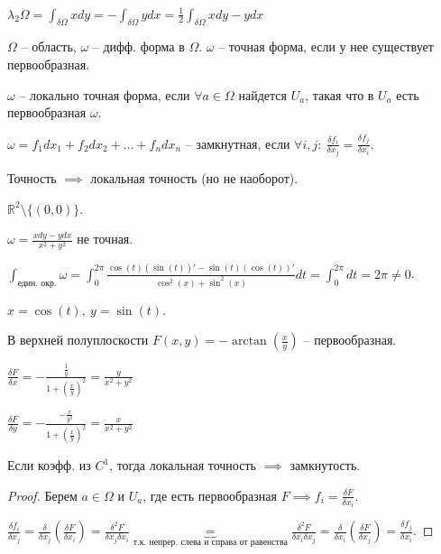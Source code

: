 \begin{consequence}
    $\lambda_2 \Omega = \int_{\delta \Omega} { xdy } = - \int_{\delta \Omega}{y d x} = \frac{1}{2} \int_{\delta \Omega} { xdy - ydx }$
\end{consequence}


\begin{definition}
    $\Omega$ -- область, $\omega$ -- дифф. форма в $\Omega$. $\omega$ -- точная форма, если у нее существует первообразная.
\end{definition}
\begin{definition}
    $\omega$ -- локально точная форма, если $\forall a \in \Omega$ найдется $U_a$, такая что в $U_a$ есть первообразная $\omega$.
\end{definition}
\begin{definition}
    $\omega = f_1 d x_1 + f_2 d x_2 + \dots + f_n d x_n$ -- замкнутная, если $\forall i, j: \ \frac{\delta f_i}{\delta x_j} = \frac{\delta f_j}{\delta x_i}$.
\end{definition}

\begin{remark}
    Точность $\implies$ локальная точность (но не наоборот).

    $\mathbb{R}^2 \setminus \{( 0, 0 )\}$.

    $\omega = \frac{x dy - y dx}{x^2 + y^2}$ не точная.

    $\int_{\text{един. окр.}} { \omega } = \int_{0}^{2\pi} { \frac{\cos(t) (\sin(t))' - \sin(t) (\cos(t))'}{\cos^2(x) + \sin^2(x)} dt} = \int_{0}^{2\pi} { dt } = 2\pi \not = 0$.

    $x = \cos(t), \ y = \sin(t)$.

    В верхней полуплоскости $F(x, y) = -\arctan\left(\frac{x}{y}\right)$ -- первообразная.

    $\frac{\delta F}{\delta x} = - \frac{\frac{1}{y}}{1 + (\frac{x}{y})^2} = \frac{y}{x^2 + y^2}$

    $\frac{\delta F}{\delta y} = - \frac{-\frac{x}{y^2}}{1 + (\frac{x}{y})^2} = \frac{x}{x^2 + y^2}$
\end{remark}

\begin{theorem}
    Если коэфф. из $C^1$, тогда локальная точность $\implies$ замкнутость.
\end{theorem}
\begin{proof}
    Берем $a \in \Omega$ и $U_a$, где есть первообразная $F \implies f_i = \frac{\delta F}{\delta x_i}$.

    $\frac{\delta f_i}{\delta x_j} = \frac{\delta}{\delta x_j} (\frac{\delta F}{\delta x_i}) = \frac{\delta^2 F}{\delta x_j \delta x_i} \underbrace{=}_{\text{т.к. непрер. слева и справа от равенства}} \frac{\delta^2 F}{\delta x_i \delta x_j} = \frac{\delta}{\delta x_i} \left( \frac{\delta F}{\delta x_j} \right) = \frac{\delta f_j}{\delta x_i}$.
\end{proof}

